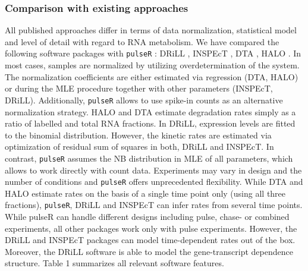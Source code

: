 \subsubsection*{Comparison with existing approaches}
All published approaches differ in terms of 
data normalization, statistical model and level of detail with regard to 
RNA metabolism. We have compared the following software packages with \verb|pulseR| :
DRiLL \citep{rabani2014high},
INSPEcT \citep{de2015inspect},
DTA \citep{schwalb2012measurement},
HALO \citep{friedel2010halo}.
In most cases, samples are normalized by utilizing overdetermination of the system.
The normalization coefficients are either estimated via regression
(DTA, HALO) or during the MLE procedure together  
with other parameters (INSPEcT, DRiLL). 
Additionally, 
\verb|pulseR| allows to use spike-in counts as an alternative normalization strategy.
HALO and DTA estimate degradation rates simply as  a ratio of labelled and
total RNA fractions.
In DRiLL, expression levels are fitted to the binomial distribution. 
However, the kinetic rates are estimated via optimization of residual sum of squares in both, DRiLL and 
INSPEcT.
In contrast, \verb|pulseR| assumes the NB distribution
in MLE of all parameters, which allows to work directly with count data.
Experiments may vary in design and the number of conditions and \verb|pulseR| offers unprecedented flexibility.
While DTA and HALO estimate rates on the basis of a single time point only (using all three fractions),
\verb|pulseR|, DRiLL and INSPEcT can infer rates from several time points.
While pulseR can handle different designs including pulse, chase- or combined 
experiments, all other packages work only with pulse experiments.
However, the DRiLL and INSPEcT packages can model 
time-dependent rates out of the box.
Moreover, the DRiLL software is able to model the gene-transcript dependence structure.
Table 1 summarizes all relevant software features.
